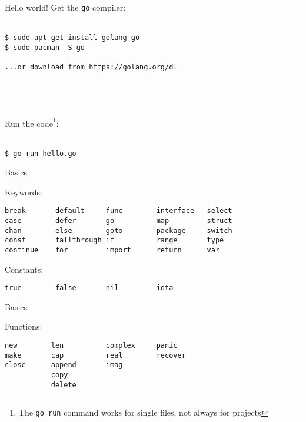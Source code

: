 \documentclass[10pt]{beamer}
\begin{document}
	
	\begin{frame}[fragile]{Hello world!}
		Get the \texttt{go} compiler:\\\\
		\begin{verbatim}
$ sudo apt-get install golang-go
$ sudo pacman -S go

...or download from https://golang.org/dl
		\end{verbatim}
		\\\\\\
		Run the code\footnote{The \texttt{go run} command works for single files, not always for projects}:\\\\
		\begin{verbatim}
$ go run hello.go
		\end{verbatim}
\end{frame}
	
	
	\begin{frame}[fragile]{Basics}
		\begin{center}
			Keywords:
		\end{center}
		\begin{verbatim}
break       default     func        interface   select
case        defer       go          map         struct
chan        else        goto        package     switch
const       fallthrough if          range       type
continue    for         import      return      var
		\end{verbatim}
		\begin{center}
			Constants:
		\end{center}
		\begin{verbatim}
true        false       nil         iota
		\end{verbatim}
\end{frame}


	\begin{frame}[fragile]{Basics}
		\begin{center}
			Functions:
		\end{center}
		\begin{verbatim}
new        len          complex     panic
make       cap          real        recover
close      append       imag
           copy 
           delete
		\end{verbatim}
\end{frame}
\end{document}
